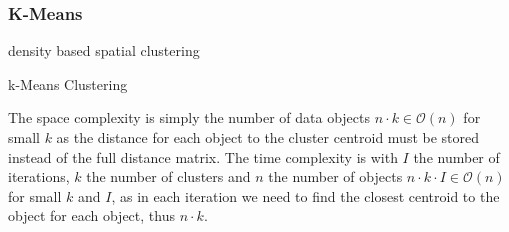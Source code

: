\subsubsection{K-Means}\label{\positionnumber}
\begin{algorithm}[htp]density based spatial clustering 
    \hrulealg
\caption{k-Means Clustering}\label{kmeans}
\end{algorithm}
The space complexity is simply the number of data objects $n \cdot k \in \mathcal{O}(n)$ for small $k$ as the distance for each object to the cluster centroid must be stored instead of the full distance matrix. The time complexity is with $I$ the number of iterations, $k$ the number of clusters and $n$ the number of objects $n \cdot k \cdot I \in \mathcal{O}(n)$ for small $k$ and $I$, as in each iteration we need to find the closest centroid to the object for each object, thus $n \cdot k$.



